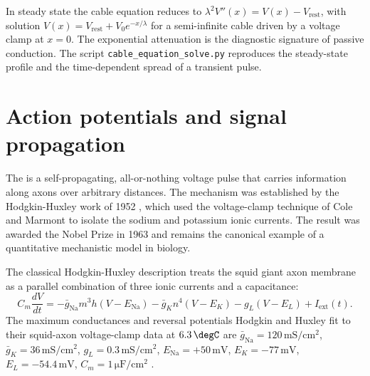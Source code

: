  In steady state the cable equation
reduces to $\lambda^2 V''(x) = V(x) - V_{\text{rest}}$, with solution
$V(x) = V_{\text{rest}} + V_0 e^{-x/\lambda}$ for a semi-infinite
cable driven by a voltage clamp at $x=0$. The exponential attenuation
is the diagnostic signature of passive conduction. The script
\verb|cable_equation_solve.py| reproduces the steady-state profile
and the time-dependent spread of a transient pulse.



\section{Action potentials and signal propagation}

The  is a self-propagating, all-or-nothing
voltage pulse that carries information along axons over arbitrary
distances. The mechanism was established by the Hodgkin-Huxley
work of 1952 \cite{paper:v6c07-hodgkin-huxley-1952,paper:v6c07-hodgkin-huxley-1952b},
which used the voltage-clamp technique of Cole and Marmont
\cite{paper:v6c07-cole-1949} to isolate the sodium and potassium
ionic currents. The result was awarded the Nobel Prize in 1963 and
remains the canonical example of a quantitative mechanistic model in
biology.

 The classical Hodgkin-Huxley
description treats the squid giant axon membrane as a parallel
combination of three ionic currents and a capacitance:
\begin{equation}
C_m \frac{dV}{dt} = -\bar{g}_{\text{Na}} m^3 h (V - E_{\text{Na}}) - \bar{g}_K n^4 (V - E_K) - g_L (V - E_L) + I_{\text{ext}}(t).
\label{eq:hh}
\end{equation}
The maximum conductances and reversal potentials Hodgkin and Huxley
fit to their squid-axon voltage-clamp data at $6.3\,\degC$ are
$\bar{g}_{\text{Na}} = 120\,\text{mS}/\text{cm}^2$,
$\bar{g}_K = 36\,\text{mS}/\text{cm}^2$,
$g_L = 0.3\,\text{mS}/\text{cm}^2$,
$E_{\text{Na}} = +50\,\text{mV}$,
$E_K = -77\,\text{mV}$,
$E_L = -54.4\,\text{mV}$,
$C_m = 1\,\si{\micro\farad}/\text{cm}^2$
\cite[p.~520]{paper:v6c07-hodgkin-huxley-1952}.

